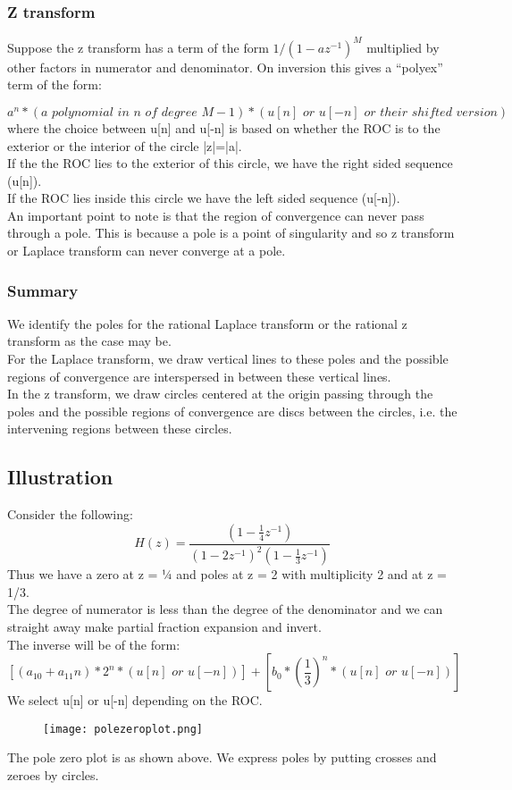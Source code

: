 \subsubsection{Z transform}
Suppose the z transform has a term of the form $1/(1-az^{-1})^M$ multiplied by other factors in numerator and denominator. On inversion this gives a “polyex” term of the form:

\[ a^n *(a\,\, polynomial\,\, in\,\, n\,\, of\,\, degree\,\, M -1)* (u[n]\,\, or\,\, u[-n]\,\, or\,\, their\,\, shifted\,\, version)\]
where the choice between u[n] and u[-n] is based on whether the ROC is to the exterior or the interior of the circle |z|=|a|.\\
If the the ROC lies to the exterior of this circle, we have the right sided sequence (u[n]).\\
If the ROC lies inside this circle we have the left sided sequence (u[-n]).\\

An important point to note is that the region of convergence can never pass through a pole. This is because a pole is a point of singularity and so z transform or Laplace transform can never converge at a pole.
\subsubsection{Summary}
We identify the poles for the rational Laplace transform or the rational z transform as the case may be. \\
For the Laplace transform, we draw vertical lines to these poles and the possible regions of convergence are interspersed in between these vertical lines. \\
In the z transform, we draw circles centered at the origin passing through the poles and the possible regions of convergence are discs between the circles, i.e. the intervening regions between these circles.
\subsection{Illustration}
Consider the following:
\[H(z) = \frac{(1-{\frac{1}{4}}z^{-1})}{(1-2z^{-1})^2(1-{\frac{1}{3}}z^{-1})}\]
Thus we have a zero at z = ¼ and poles at z = 2 with multiplicity 2 and at z = 1/3. \\
The degree of numerator is less than the degree of the denominator and we can straight away make partial fraction expansion and invert. \\
The inverse will be of the form:
\[[(a_{10} + a_{11}n) * 2^n *(u[n]\,\, or\,\, u[-n])] + [b_{0}*({\frac{1}{3}})^n *( u[n]\,\, or\,\, u[-n])]\]
We select u[n] or u[-n] depending on the ROC.\\
\begin{figure}[h!]
	\centering
	\texttt{[image: polezeroplot.png]}
\end{figure}    
The pole zero plot is as shown above. We express poles by putting crosses and zeroes by circles. \\

